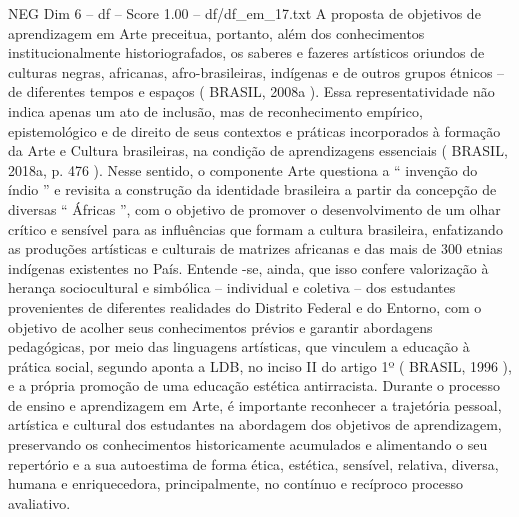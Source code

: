 \begin{textsample}{NEG Dim 6 – df – Score 1.00 – df/df\_em\_17.txt}
A proposta de objetivos de aprendizagem em Arte preceitua, portanto, além dos conhecimentos institucionalmente historiografados, os saberes e fazeres artísticos oriundos de culturas negras, africanas, afro-brasileiras, indígenas e de outros grupos étnicos – de diferentes tempos e espaços ( BRASIL, 2008a ).
Essa representatividade não indica apenas um ato de inclusão, mas de reconhecimento empírico, epistemológico e de direito de seus contextos e práticas incorporados à formação da Arte e Cultura brasileiras, na condição de aprendizagens essenciais ( BRASIL, 2018a, p. 476 ).
Nesse sentido, o componente Arte questiona a “ invenção do índio ” e revisita a construção da identidade brasileira a partir da concepção de diversas “ Áfricas ”, com o objetivo de promover o desenvolvimento de um olhar crítico e sensível para as influências que formam a cultura brasileira, enfatizando as produções artísticas e culturais de matrizes africanas e das mais de 300 etnias indígenas existentes no País.
Entende -se, ainda, que isso confere valorização à herança sociocultural e simbólica – individual e coletiva – dos estudantes provenientes de diferentes realidades do Distrito Federal e do Entorno, com o objetivo de acolher seus conhecimentos prévios e garantir abordagens pedagógicas, por meio das linguagens artísticas, que vinculem a educação à prática social, segundo aponta a LDB, no inciso II do artigo 1º ( BRASIL, 1996 ), e a própria promoção de uma educação estética antirracista.
Durante o processo de ensino e aprendizagem em Arte, é importante reconhecer a trajetória pessoal, artística e cultural dos estudantes na abordagem dos objetivos de aprendizagem, preservando os conhecimentos historicamente acumulados e alimentando o seu repertório e a sua autoestima de forma ética, estética, sensível, relativa, diversa, humana e enriquecedora, principalmente, no contínuo e recíproco processo avaliativo.

\end{textsample}
